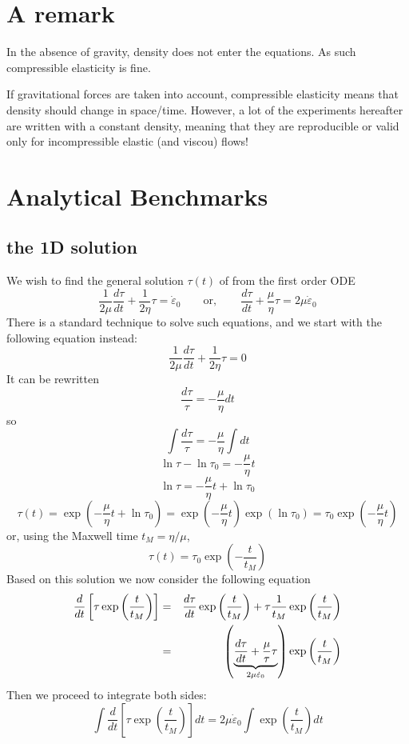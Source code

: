 \section{A remark}

In the absence of gravity, density does not enter the equations. 
As such compressible elasticity is fine. 

If gravitational forces are taken into account, compressible elasticity
means that density should change in space/time. However, 
a lot of the experiments hereafter are written with a constant density, 
meaning that they are reproducible or valid only for incompressible elastic (and viscou) flows!

\section{Analytical Benchmarks}

\subsection{the 1D solution}
We wish to find the general solution $\tau(t)$ of from the first order ODE
\[
\frac{1}{2\mu} \frac{d\tau}{dt} + \frac{1}{2\eta} \tau = \dot\varepsilon_0
\qquad
\text{or},
\qquad
\frac{d\tau}{dt} + \frac{\mu}{\eta} \tau = 2\mu \dot\varepsilon_0
\]
There is a standard technique to solve such equations, and we start with the following equation instead:
\[
\frac{1}{2\mu} \frac{d\tau}{dt} + \frac{1}{2\eta} \tau = 0
\]
It can be rewritten
\[
\frac{d\tau}{\tau} = -\frac{\mu}{\eta} dt
\]
so
\[
\int \frac{d\tau}{\tau} = -\frac{\mu}{\eta} \int dt
\]
\[
\ln \tau - \ln \tau_0 = -\frac{\mu}{\eta} t 
\]
\[
\ln \tau = -\frac{\mu}{\eta} t  + \ln \tau_0
\]
\[
\tau(t) 
= \exp \left(  -\frac{\mu}{\eta} t  + \ln \tau_0 \right) 
= \exp \left(  -\frac{\mu}{\eta} t   \right)   \exp \left(  \ln \tau_0 \right) 
= \tau_0 \exp \left(  -\frac{\mu}{\eta} t   \right) 
\]
or, using the Maxwell time $t_M=\eta/\mu$,
\[
\tau(t) 
= \tau_0 \exp \left(  -\frac{t}{t_M}   \right) 
\]
Based on this solution we now 
consider the following equation
\begin{eqnarray}
\frac{d}{dt} \left[   \tau \exp\left( \frac{t}{t_M}   \right)  \right]
&=& 
\frac{d \tau}{dt}  \exp\left( \frac{t}{t_M}   \right)  +
\tau \frac{1}{t_M} \exp\left( \frac{t}{t_M}   \right)  \nonumber\\
&=& 
\left( \underbrace{\frac{d \tau}{dt} + \frac{\mu}{\tau} \tau}_{2\mu \dot\varepsilon_0}  \right)  \exp\left( \frac{t}{t_M}   \right)  \nonumber
\end{eqnarray}
Then we proceed to integrate both sides:
\[
\int \frac{d}{dt} \left[   \tau \exp\left( \frac{t}{t_M}   \right)  \right] dt
= 2\mu \dot\varepsilon_0 \int \exp\left( \frac{t}{t_M}   \right)  dt
\]

